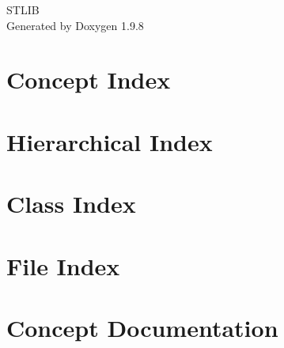 \documentclass[twoside]{book}
\newcommand{\+}{\discretionary{\mbox{\scriptsize$\hookleftarrow$}}{}{}}
\newcommand{\clearemptydoublepage}{%
    \newpage{\pagestyle{empty}\cleardoublepage}%
  }
\begin{document}
  \raggedbottom
    \hypersetup{pageanchor=false,
                bookmarksnumbered=true,
                pdfencoding=unicode
               }
  \begin{titlepage}
  \vspace*{7cm}
  \begin{center}%
  {\Large STLIB}\\
  \vspace*{1cm}
  {\large Generated by Doxygen 1.9.8}\\
  \end{center}
  \end{titlepage}
  \clearemptydoublepage
  \tableofcontents
  \clearemptydoublepage
  \hypersetup{pageanchor=true}
\chapter{Concept Index}

\chapter{Hierarchical Index}

\chapter{Class Index}

\chapter{File Index}

\chapter{Concept Documentation}














\end{document}
